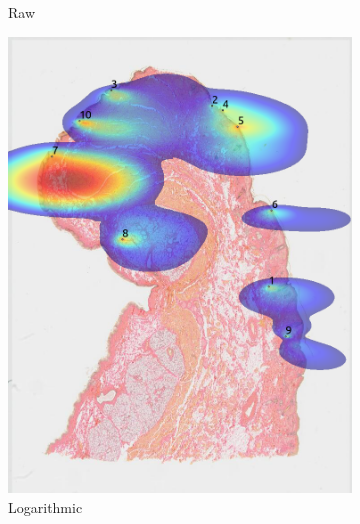 \documentclass[a4paper,11pt]{report}
\numberwithin{figure}{chapter} %
\begin{document}
\begin{itemize}
\begin{figure}[H]
\begin{subfigure}[b]{0.19\textwidth}
            \caption{Raw}
            \end{subfigure}
            \begin{subfigure}[b]{0.19\textwidth}
            \includegraphics[width=\textwidth]{images/5501147_heatmap_ln.png}
            \caption{Logarithmic}
            \end{subfigure}
            \begin{subfigure}[b]{0.19\textwidth}

\end{subfigure}
\end{figure}
\end{itemize}
\end{document}
